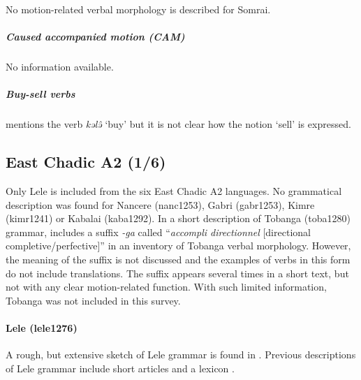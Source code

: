 No motion-related verbal morphology is described for Somrai. 

\subparagraph{Caused accompanied motion (CAM)}

No information available. 

\subparagraph{Buy-sell verbs}

\citet[61]{millerInformationStructureSoumraye2020} mentions the verb \textit{kələ̂} `buy' but it is not clear how the notion `sell' is expressed. 

\subsection{East Chadic A2 (1/6)}

Only Lele is included from the six East Chadic A2 languages. No grammatical description was found for Nancere (nanc1253), Gabri (gabr1253), Kimre (kimr1241) or Kabalai (kaba1292). In a short description of Tobanga (toba1280) grammar, \citet[141]{caprileNotesLinguistiquesTobanga1978} includes a suffix \textit{-ga} called ``\textit{accompli directionnel} [directional completive/perfective]'' in an inventory of Tobanga verbal morphology. However, the meaning of the suffix is not discussed and the examples of verbs in this form do not include translations. The suffix appears several times in a short text, but not with any clear motion-related function. With such limited information, Tobanga was not included in this survey. 

\paragraph*{Lele (lele1276)} \label{lele}

A rough, but extensive sketch of Lele grammar is found in \citet{frajzyngierGrammarLele2001}. Previous descriptions of Lele grammar include short articles \citep{simonscopeNeBeMarking1982,simonscopePluralLele1993,simonscopeCommentsNominalizationLele1986} and a lexicon \citep{146082}. 


